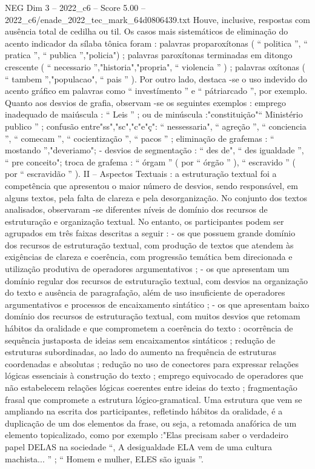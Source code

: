 \begin{textsample}{NEG Dim 3 – 2022\_c6 – Score 5.00 – 2022\_c6/enade\_2022\_tec\_mark\_64d0806439.txt}
Houve, inclusive, respostas com ausência total de cedilha ou til.
Os casos mais sistemáticos de eliminação do acento indicador da sílaba tônica foram : palavras proparoxítonas ( “ politica ”, “ pratica ”, “ publica ”,"policia") ; palavras paroxítonas terminadas em ditongo crescente ( “ necessario ”,"historia","propria", “ violencia ” ) ; palavras oxítonas ( “ tambem ”,"populacao", “ pais ” ).
Por outro lado, destaca -se o uso indevido do acento gráfico em palavras como “ investímento ” e “ pátriarcado ”, por exemplo.
Quanto aos desvios de grafia, observam -se os seguintes exemplos : emprego inadequado de maiúscula : “ Leis ” ; ou de minúscula :"constituição"“ Ministério publico ” ; confusão entre"ss","sc","c"e"ç": “ nessessaria", “ agreção ”, “ conciencia ”, “ comecam ”, “ cocientização ”, “ pacos ” ; eliminação de grafemas : “ mostando ”,"deveriamo"; - desvios de segmentação : “ des de", “ des igualdade ”, “ pre conceito"; troca de grafema : “ órgam ” ( por “ órgão ” ), “ escravido ” ( por “ escravidão ” ).
II – Aspectos Textuais : a estruturação textual foi a competência que apresentou o maior número de desvios, sendo responsável, em alguns textos, pela falta de clareza e pela desorganização.
No conjunto dos textos analisados, observaram -se diferentes níveis de domínio dos recursos de estruturação e organização textual.
No entanto, os participantes podem ser agrupados em três faixas descritas a seguir : - os que possuem grande domínio dos recursos de estruturação textual, com produção de textos que atendem às exigências de clareza e coerência, com progressão temática bem direcionada e utilização produtiva de operadores argumentativos ; - os que apresentam um domínio regular dos recursos de estruturação textual, com desvios na organização do texto e ausência de paragrafação, além de uso insuficiente de operadores argumentativos e processos de encaixamento sintático ; - os que apresentam baixo domínio dos recursos de estruturação textual, com muitos desvios que retomam hábitos da oralidade e que comprometem a coerência do texto : ocorrência de sequência justaposta de ideias sem encaixamentos sintáticos ; redução de estruturas subordinadas, ao lado do aumento na frequência de estruturas coordenadas e absolutas ; redução no uso de conectores para expressar relações lógicas essenciais à construção do texto ; emprego equivocado de operadores que não estabelecem relações lógicas coerentes entre ideias do texto ; fragmentação frasal que compromete a estrutura lógico-gramatical.
Uma estrutura que vem se ampliando na escrita dos participantes, refletindo hábitos da oralidade, é a duplicação de um dos elementos da frase, ou seja, a retomada anafórica de um elemento topicalizado, como por exemplo :"Elas precisam saber o verdadeiro papel DELAS na sociedade “, A desigualdade ELA vem de uma cultura machista... ” ; “ Homem e mulher, ELES são iguais ”.

\end{textsample}
